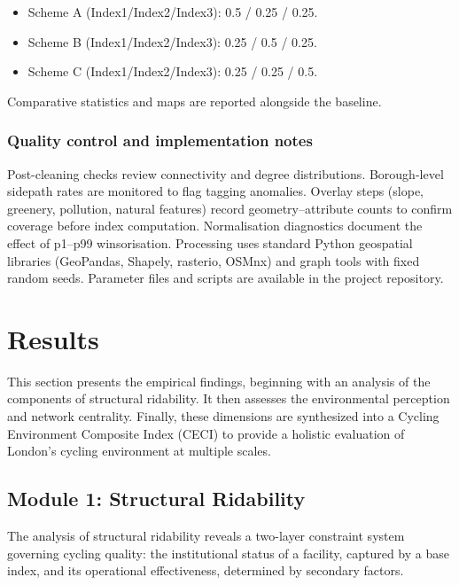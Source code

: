 \documentclass[
  12pt,
  oneside]{book}
\begin{document}
\begin{itemize}
\item
  Scheme A (Index1/Index2/Index3): 0.5 / 0.25 / 0.25.
\item
  Scheme B (Index1/Index2/Index3): 0.25 / 0.5 / 0.25.
\item
  Scheme C (Index1/Index2/Index3): 0.25 / 0.25 / 0.5.
\end{itemize}

Comparative statistics and maps are reported alongside the baseline.

\subsection{Quality control and implementation notes}\label{quality-control-and-implementation-notes}

Post-cleaning checks review connectivity and degree distributions. Borough-level sidepath rates are monitored to flag tagging anomalies. Overlay steps (slope, greenery, pollution, natural features) record geometry--attribute counts to confirm coverage before index computation. Normalisation diagnostics document the effect of p1--p99 winsorisation. Processing uses standard Python geospatial libraries (GeoPandas, Shapely, rasterio, OSMnx) and graph tools with fixed random seeds. Parameter files and scripts are available in the project repository.

\chapter{Results}\label{results}

This section presents the empirical findings, beginning with an analysis of the components of structural ridability. It then assesses the environmental perception and network centrality. Finally, these dimensions are synthesized into a Cycling Environment Composite Index (CECI) to provide a holistic evaluation of London's cycling environment at multiple scales.

\section{Module 1: Structural Ridability}\label{module-1-structural-ridability}

The analysis of structural ridability reveals a two-layer constraint system governing cycling quality: the institutional status of a facility, captured by a base index, and its operational effectiveness, determined by secondary factors.
\end{document}
